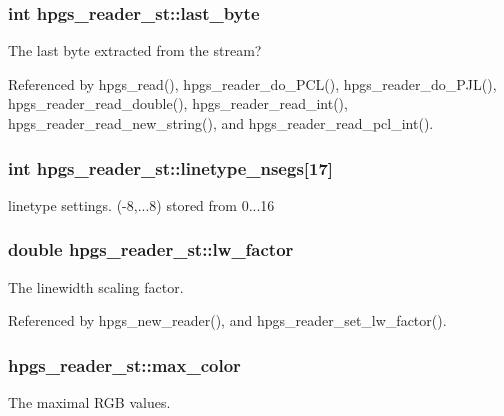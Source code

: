 \subsubsection[{last\_\-byte}]{\setlength{\rightskip}{0pt plus 5cm}int {\bf hpgs\_\-reader\_\-st::last\_\-byte}}\label{structhpgs__reader__st_aa3fce47e898bffa3c3799f252bf2ea82}
The last byte extracted from the stream? 

Referenced by hpgs\_\-read(), hpgs\_\-reader\_\-do\_\-PCL(), hpgs\_\-reader\_\-do\_\-PJL(), hpgs\_\-reader\_\-read\_\-double(), hpgs\_\-reader\_\-read\_\-int(), hpgs\_\-reader\_\-read\_\-new\_\-string(), and hpgs\_\-reader\_\-read\_\-pcl\_\-int().

\subsubsection[{linetype\_\-nsegs}]{\setlength{\rightskip}{0pt plus 5cm}int {\bf hpgs\_\-reader\_\-st::linetype\_\-nsegs}[17]}\label{structhpgs__reader__st_a3f097e4de0c64307c99d18e4597ebb2e}
linetype settings. (-\/8,...8) stored from 0...16 
\subsubsection[{lw\_\-factor}]{\setlength{\rightskip}{0pt plus 5cm}double {\bf hpgs\_\-reader\_\-st::lw\_\-factor}}\label{structhpgs__reader__st_a8d52bb49d1520e0f7478e8da42779f3b}
The linewidth scaling factor. 

Referenced by hpgs\_\-new\_\-reader(), and hpgs\_\-reader\_\-set\_\-lw\_\-factor().

\subsubsection[{max\_\-color}]{ {\bf hpgs\_\-reader\_\-st::max\_\-color}}\label{structhpgs__reader__st_ae84048978a285048a6c4e30bf442d969}
The maximal RGB values. 
